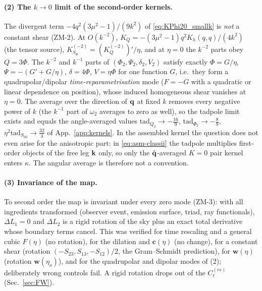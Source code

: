 \paragraph{(2) The $k\to0$ limit of the second-order kernels.}  The divergent term $-4q^2(3\mu^2-1)/(9k^2)$ of \eqref{eq:KPhi20_smallk} is \emph{not} a
constant shear (ZM-2).  At $O(k^{-2})$, $K_Q=-(3\mu^2-1)q^2K_h(q,q)/(4k^2)$ (the tensor source), $K_{S_\Phi}^{(-2)}=(K_Q^{(-2)})'/\eta$, and at $\eta=0$ the
$k^{-2}$ parts obey $Q=3\Phi$.  The $k^{-2}$ and $k^{-1}$ parts of $(\Phi_2,\Psi_2,\delta_2,V_2)$ satisfy exactly $\Phi=G/\eta$, $\Psi=-(G'+G/\eta)$,
$\delta=4\Phi$, $V=\eta\Phi$ for one function $G$, i.e.\ they form a quadrupolar/dipolar \emph{time-reparametrisation} mode ($F=-G$ with a quadratic or
linear dependence on position), whose induced homogeneous shear vanishes at $\eta=0$.  The average over the direction of $\mathbf q$ at fixed $k$
removes every negative power of $k$ (the $k^{-1}$ part of $\omega_2$ averages to zero as well), so the tadpole limit exists and equals the
angle-averaged values $\mathrm{tad}_{Q_2}\to-\tfrac{16}9$, $\mathrm{tad}_{\Phi_2}\to-\tfrac89$, $\eta^2\mathrm{tad}_{S_{00}}\to\tfrac{32}3$ of App.~\ref{app:kernels}.
In the assembled kernel the question does not even arise for the anisotropic part: in \eqref{eq:asm-classii} the tadpole multiplies first-order
objects of the free leg $\mathbf k$ only, so only the $\hat{\mathbf q}$-averaged $K=0$ pair kernel enters $\kappa$.  The angular average is therefore not a convention.

\paragraph{(3) Invariance of the map.}  To second order the map is invariant under every zero mode (ZM-3): with all ingredients transformed
(observer event, emission surface, triad, ray functionals), $\Delta L_1=0$ and $\Delta L_2$ is a rigid rotation of the sky plus an exact total
derivative whose boundary terms cancel.  This was verified for time rescaling and a general cubic $F(\eta)$ (no rotation), for the dilation and
$\mathbf c(\eta)$ (no change), for a constant shear (rotation $(-S_{23},S_{13},-S_{12})/2$, the Gram--Schmidt prediction), for $\mathbf w(\eta)$ (rotation
$\mathbf w(\eta_o)$), and for the quadrupolar and dipolar modes of (2); deliberately wrong controls fail.  A rigid rotation drops out of the $C^{(rs)}_\ell$
(Sec.~\ref{sec:FW}).

